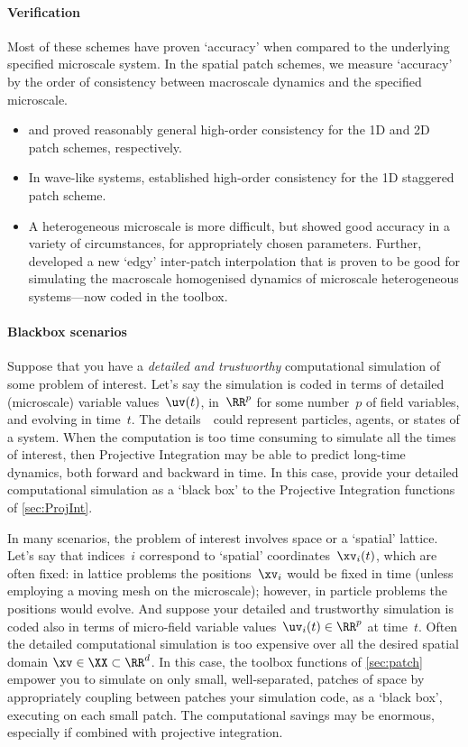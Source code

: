 \paragraph{Verification}
Most of these schemes have proven `accuracy' when compared to the underlying specified microscale system.
In the spatial patch schemes, we measure `accuracy' by the order of consistency between macroscale dynamics and the specified microscale.  
\begin{itemize}
\item \cite{Roberts06d} and \cite{Roberts2011a} proved reasonably general high-order consistency for the 1D and 2D patch schemes, respectively.
\item In wave-like systems, \cite{Cao2014a} established high-order consistency for the 1D staggered patch scheme.
\item A heterogeneous microscale is more difficult, but \cite{Bunder2013b} showed good accuracy in a variety of circumstances, for appropriately chosen parameters. 
Further, \cite{Bunder2020a} developed a new `edgy' inter-patch interpolation that is proven to be good for simulating the macroscale homogenised dynamics of microscale heterogeneous systems---now coded in the toolbox.
\end{itemize}



\paragraph{Blackbox scenarios} 
Suppose that you have a \emph{detailed and trustworthy} computational simulation of some problem of interest.
Let's say the simulation is coded in terms of detailed (microscale) variable values~\(\uv(t)\), in~\(\RR^{p}\) for some number~\(p\) of field variables, and evolving in time~\(t\).
The details~\uv\ could represent particles, agents, or states of a system.
When the computation is too time consuming to simulate all the times of interest, then Projective Integration may be able to predict long-time dynamics, both forward and backward in time.  
In this case, provide your detailed computational simulation as a `black box' to the Projective Integration functions of \cref{sec:ProjInt}.

In many scenarios, the problem of interest involves space or a `spatial' lattice.
Let's say that indices~\(i\) correspond to `spatial' coordinates~\(\xv_i(t)\), which are often fixed: in lattice problems the positions~\(\xv_i\) would be fixed in time (unless employing a moving mesh on the microscale); however, in particle problems the positions would evolve.
And suppose your detailed and trustworthy simulation is coded also in terms of micro-field variable values~\(\uv_i(t)\in\RR^p\) at time~\(t\).
Often the detailed computational simulation is too expensive over all the desired spatial domain \(\xv\in\XX\subset\RR^{d}\).
In this case, the toolbox functions of \cref{sec:patch} empower you to simulate on only small, well-separated, patches of space by appropriately coupling between patches your simulation code, as a `black box', executing on each small patch. 
The computational savings may be enormous, especially if combined with projective integration.

